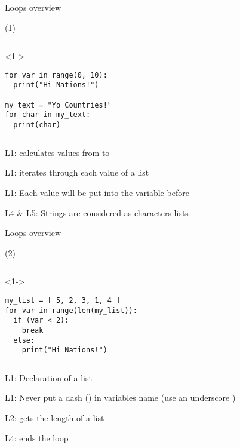 
\begin{frame}[fragile]{Loops overview}

   (1)

  \begin{columns}[onlytextwidth]
    \begin{column}{\textwidth}
      \begin{onlyenv}<1->
        \begin{lstlisting}[style=python]
for var in range(0, 10):
  print("Hi Nations!")

my_text = "Yo Countries!"
for char in my_text:
  print(char) \end{lstlisting}
      \end{onlyenv}
    \end{column}
  \end{columns}

   L1:  calculates values from  to 

   L1:  iterates through each value of a list

   L1: Each value will be put into the variable before 

   L4 \& L5: Strings are considered as characters lists

\end{frame}


\begin{frame}[fragile]{Loops overview}

   (2)

  \begin{columns}[onlytextwidth]
    \begin{column}{\textwidth}
      \begin{onlyenv}<1->
        \begin{lstlisting}[style=python]
my_list = [ 5, 2, 3, 1, 4 ]
for var in range(len(my_list)):
  if (var < 2):
    break
  else:
    print("Hi Nations!") \end{lstlisting}
      \end{onlyenv}
    \end{column}
  \end{columns}

   L1: Declaration of a list

   L1: Never put a dash (\TTBF{-}) in variables name (use an underscore \TTBF{\_})

   L2:  gets the length of a list

   L4:  ends the loop

\end{frame}



